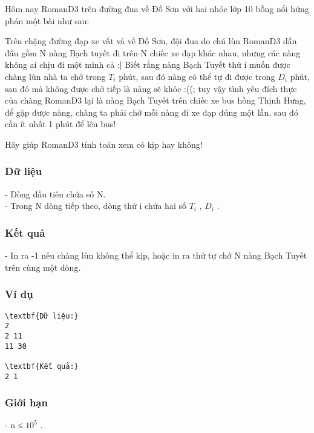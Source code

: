 







   Hôm nay RomanD3 trên đường đua về Đồ Sơn với hai nhóc lớp 10 bỗng nổi hứng phán một bài như sau:  

   Trên chặng đường đạp xe vất vả về Đồ Sơn, đội đua do chú lùn RomanD3 dẫn đầu gồm N nàng Bạch tuyết đi trên N chiếc xe đạp khác nhau, nhưng các nàng không ai chịu đi một mình cả :| Biết rằng nàng Bạch Tuyết thứ i muốn được chàng lùn nhà ta chở trong $T_{i}$   phút, sau đó nàng có thể tự đi được trong $D_{i}$   phút, sau đó mà không được chở tiếp là nàng sẽ khóc :((; tuy vậy tình yêu đích thực của chàng RomanD3 lại là nàng Bạch Tuyết trên chiếc xe bus hồng Thịnh Hưng, để gặp được nàng, chàng ta phải chở mỗi nàng đi xe đạp đúng một lần, sau đó cần ít nhất 1 phút để lên bus!  

   Hãy giúp RomanD3 tính toán xem có kịp hay không!  

\subsubsection{   Dữ liệu  }

   - Dòng đầu tiên chứa số N.   
\\   - Trong N dòng tiếp theo, dòng thứ i chứa hai số $T_{i}$   , $D_{i}$   .  

\subsubsection{   Kết quả  }

   - In ra -1 nếu chàng lùn không thể kịp, hoặc in ra thứ tự chở N nàng Bạch Tuyết trên cùng một dòng.  

\subsubsection{   Ví dụ  }
\begin{verbatim}
\textbf{Dữ liệu:}
2
2 11
11 30

\textbf{Kết quả:}
2 1
\end{verbatim}

\subsubsection{   Giới hạn  }

   - n ≤ $10^{5}$   .  

